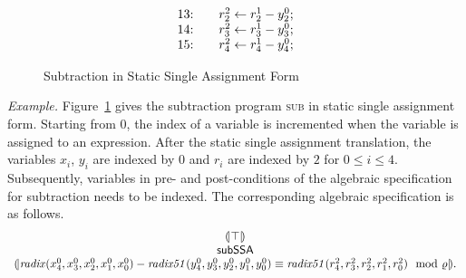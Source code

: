 \begin{figure}
\[\begin{array}{lclcl}
\begin{array}{rcl}
    \textmd{13:} && {r}^2_2 \leftarrow {r}^1_2 - {y}^0_2; \\
    \textmd{14:} && {r}^2_3 \leftarrow {r}^1_3 - {y}^0_3; \\
    \textmd{15:} && {r}^2_4 \leftarrow {r}^1_4 - {y}^0_4;
    \end{array}
  \end{array}
  \]
  \caption{Subtraction  in Static Single Assignment Form}
  \label{figure:translation:subtraction-ssa}
\end{figure}

\noindent
\emph{Example.}
Figure~\ref{figure:translation:subtraction-ssa} gives the subtraction program
\textsc{sub} in static single assignment form. Starting from $0$, the
index of a variable is incremented when the variable is assigned to an
expression. After the static single assignment translation, the
variables ${x}_i$, ${y}_i$ are indexed by $0$ and
${r}_i$ are indexed by $2$ for $0 \leq i \leq 4$. 
Subsequently, variables in pre- and post-conditions of the algebraic
specification for subtraction needs to be indexed. The
corresponding algebraic specification is as follows.
\[
\begin{array}{c}
{(\!|}{\top}{|\!)}\\
\mbox{\textsf{subSSA}}\\
{(\!|}{\mathit{radix}({x}^0_4, {x}^0_3, {x}^0_2, {x}^0_1, {x}^0_0) -
\mathit{radix51}({y}^0_4, {y}^0_3, {y}^0_2, {y}^0_1, {y}^0_0)
\equiv
\mathit{radix51}({r}^2_4, {r}^2_3, {r}^2_2, {r}^2_1, {r}^2_0)
\mod {\varrho}
}{|\!)}.
\end{array}
\]

